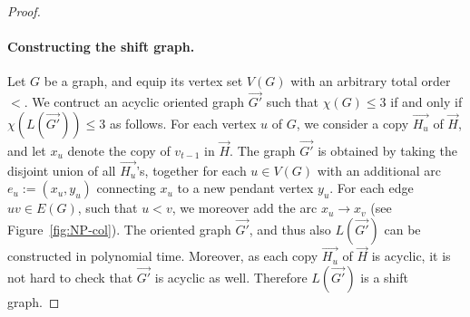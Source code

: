 \documentclass[11pt,a4aper]{article}
\renewcommand{\le}{\leqslant}
\DeclareRobustCommand*{\ora}{\overrightarrow}
\newcommand*{\orGp}{\ora{G'}}
\newcommand*{\orH}{\ora{H}}
\newcommand*{\orHu}{\ora{H_u}}
\begin{document}
\begin{proof}



  \paragraph{Constructing the shift graph.}
  Let $G$ be a graph, and equip its vertex set $V(G)$ with an arbitrary total order $<$. We contruct an acyclic oriented graph $\orGp$ such that
  $\chi(G) \le 3$ if and only if $\chi(L(\orGp)) \le 3$ as follows. For each
  vertex $u$ of $G$, we consider a copy $\orHu$ of $\orH$, and let $x_u$ denote the copy of $v_{t-1}$ in $\orH$. The graph $\orGp$ is obtained by taking the disjoint union of all $\orHu$'s, together for each $u\in V(G)$ with an additional arc $e_u:=(x_u,y_u)$ connecting $x_u$ to a new pendant vertex $y_u$. For each edge $uv \in E(G)$, such that $u < v$, we moreover add the
  arc $x_u \to x_v$ (see Figure~\ref{fig:NP-col}). The oriented graph $\orGp$, and thus also $L(\orGp)$
  can be constructed in polynomial time. Moreover, as each copy $\orHu$ of $\orH$ is acyclic, it is not hard to check that $\orGp$ is acyclic as well. Therefore $L(\orGp)$ is a shift graph.
  

\end{proof}
\end{document}

